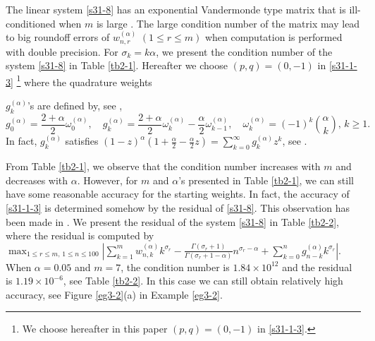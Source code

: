 \documentclass[10pt]{siamltex}
\begin{document}
The linear system \eqref{s31-8} has  an exponential Vandermonde type matrix  that is ill-conditioned when $m$ is  large
\cite{DieFord06}. The  large condition number of the matrix  may lead to  big roundoff errors of $w_{n,r}^{(\alpha)}$ $(1\leq r \leq m)$  when  computation is performed with double precision. For  $\sigma_k=k\alpha$,   we present the condition number of  the system \eqref{s31-8} in   Table \ref{tb2-1}. Hereafter we  choose   $(p,q)=(0,-1)$ in \eqref{s31-1-3} \footnote{
We choose hereafter in this paper   $(p,q)=(0,-1)$ in \eqref{s31-1-3}.}
 where the quadrature weights
\iffalse
\begin{equation}\label{sweight}\begin{aligned}
\mathcal{{A}}_{p,q}^{\alpha,n}=\frac{1}{\tau^{\alpha}}\sum_{k=0}^ng^{(\alpha)}_{n-k}U(t_k)
\end{aligned}\end{equation}
where
\fi
 $g^{(\alpha)}_{k}$'s are defined by, see \cite{Lub86,TianZD14,WangVong14b},
\begin{equation}\label{g-k}
g^{(\alpha)}_{0}=\frac{2+\alpha}{2}\omega^{(\alpha)}_{0},{\quad}
g^{(\alpha)}_{k}=\frac{2+\alpha}{2}\omega^{(\alpha)}_{k}-\frac{\alpha}{2}\omega^{(\alpha)}_{k-1},\quad \omega^{(\alpha)}_k=(-1)^k\binom{\alpha}{k},\,k\geq 1.
\end{equation}
In fact, $g^{(\alpha)}_{k}$ satisfies $(1-z)^{\alpha}\left(1+\frac{\alpha}{2}
-\frac{\alpha}{2} z\right)=\sum_{k=0}^{\infty}g^{(\alpha)}_{k}z^k$, see \cite{Lub86}.




From Table \ref{tb2-1}, we observe that the condition number increases with $m$ and decreases with $\alpha$. However, for  $m$ and $\alpha$'s presented in Table \ref{tb2-1}, we can still have some reasonable accuracy for the starting weights.
In fact, the accuracy of \eqref{s31-1-3}  is determined somehow by
the  residual of \eqref{s31-8}.
 This observation has been made
 in  \cite{DieFord06,Lub86}.   We present the residual of the system \eqref{s31-8} in Table \ref{tb2-2}, where the residual  is computed by
$\max_{1\leq r \leq m,\,1\leq n \leq 100}|\sum_{k=1}^mw_{n,k}^{(\alpha)}k^{\sigma_r}
-\frac{\Gamma(\sigma_r+1)}{\Gamma(\sigma_r+1-\alpha)}n^{\sigma_r-\alpha}
+\sum_{k=0}^{n}g^{(\alpha)}_{n-k}k^{\sigma_r}|.$  When  $\alpha=0.05$ and $m=7$, the condition number is $1.84\times 10^{12}$  and the residual is   $1.19\times 10^{-6}$, see Table \ref{tb2-2}. In this case we can still obtain relatively high accuracy, see Figure \ref{eg3-2}(a) in Example \ref{eg3-2}.
\end{document}
